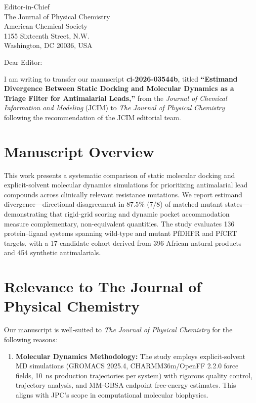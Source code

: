 \documentclass[11pt]{letter}
\begin{document}
\begin{letter}{%
    Editor-in-Chief \\
    The Journal of Physical Chemistry \\
    American Chemical Society \\
    1155 Sixteenth Street, N.W. \\
    Washington, DC 20036, USA
}

\opening{Dear Editor:}

I am writing to transfer our manuscript \textbf{ci-2026-03544b}, titled \textbf{``Estimand Divergence Between Static Docking and Molecular Dynamics as a Triage Filter for Antimalarial Leads,''} from the \textit{Journal of Chemical Information and Modeling} (JCIM) to \textit{The Journal of Physical Chemistry} following the recommendation of the JCIM editorial team.

\section*{Manuscript Overview}

This work presents a systematic comparison of static molecular docking and explicit-solvent molecular dynamics simulations for prioritizing antimalarial lead compounds across clinically relevant resistance mutations. We report estimand divergence---directional disagreement in 87.5\% (7/8) of matched mutant states---demonstrating that rigid-grid scoring and dynamic pocket accommodation measure complementary, non-equivalent quantities. The study evaluates 136 protein--ligand systems spanning wild-type and mutant PfDHFR and PfCRT targets, with a 17-candidate cohort derived from 396 African natural products and 454 synthetic antimalarials.

\section*{Relevance to The Journal of Physical Chemistry}

Our manuscript is well-suited to \textit{The Journal of Physical Chemistry} for the following reasons:

\begin{enumerate}
    \item \textbf{Molecular Dynamics Methodology:} The study employs explicit-solvent MD simulations (GROMACS 2025.4, CHARMM36m/OpenFF 2.2.0 force fields, 10~ns production trajectories per system) with rigorous quality control, trajectory analysis, and MM-GBSA endpoint free-energy estimates. This aligns with JPC's scope in computational molecular biophysics.
    

\end{enumerate}
\end{letter}
\end{document}
